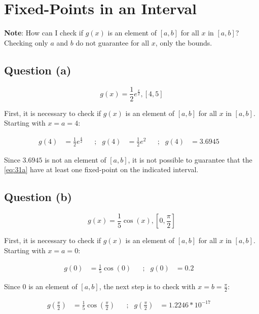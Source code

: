 \section{Fixed-Points in an Interval}

	\textbf{Note}: How can I check if $g(x)$ is an element of $[a,b]$ for all $x$ in $[a,b]$? Checking only $a$ and $b$ do not guarantee for all $x$, only the bounds.
	
	\subsection{Question (a)}
	
	\begin{equation}
		g(x) = \frac{1}{2}e^{\frac{x}{2}},[4,5]
	\label{eq:31a}
	\end{equation}
	
	First, it is necessary to check if $g(x)$ is an element of $[a,b]$ for all $x$ in $[a,b]$. Starting with $x = a = 4$:
	
	\begin{align}
		g(4) &= \frac{1}{2}e^{\frac{4}{2}}& &;&
		g(4) &= \frac{1}{2}e^{2}& &;&
		g(4) &= 3.6945&
	\label{eq:31a4x}
	\end{align}

	Since $3.6945$ is not an element of $[a,b]$, it is not possible to guarantee that the \cref{eq:31a} have at least one fixed-point on the indicated interval.

	\subsection{Question (b)}
	
	\begin{equation}
		g(x) = \frac{1}{5}\cos(x),\left[0,\frac{\pi}{2}\right]
	\label{eq:31b}
	\end{equation}
	
	First, it is necessary to check if $g(x)$ is an element of $[a,b]$ for all $x$ in $[a,b]$. Starting with $x = a = 0$:
	
	\begin{align}
		g(0) &= \frac{1}{5}\cos(0)& &;&
		g(0) &= 0.2&
	\label{eq:31b0x}
	\end{align}

	Since $0$ is an element of $[a,b]$, the next step is to check with $x = b = \frac{\pi}{2}$:

	\begin{align}
		g\left(\frac{\pi}{2}\right) &= \frac{1}{5}\cos\left(\frac{\pi}{2}\right)& &;& 
		g\left(\frac{\pi}{2}\right) &= 1.2246 * 10^{-17}&
	\label{eq:31bpix}
	\end{align}


